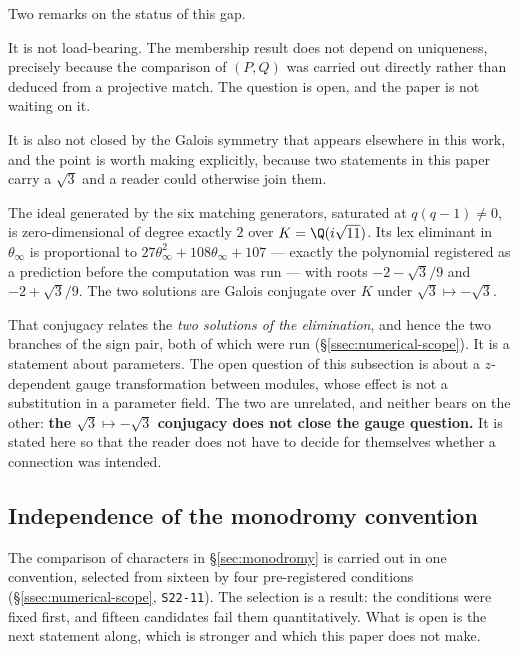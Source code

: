 Two remarks on the status of this gap.

It is not load-bearing. The membership result does not depend on uniqueness,
precisely because the comparison of $(P,Q)$ was carried out directly rather
than deduced from a projective match. The question is open, and the paper is
not waiting on it.

It is also not closed by the Galois symmetry that appears elsewhere in this
work, and the point is worth making explicitly, because two statements in this
paper carry a $\sqrt3$ and a reader could otherwise join them.

\begin{remark}
The ideal generated by the six matching generators, saturated at $q(q-1)\neq0$,
is zero-dimensional of degree exactly $2$ over $K=\Q(i\sqrt{11})$. Its lex
eliminant in $\theta_\infty$ is proportional to
$27\theta_\infty^{2}+108\theta_\infty+107$ --- exactly the polynomial
registered as a prediction before the computation was run --- with roots
$-2-\sqrt3/9$ and $-2+\sqrt3/9$. The two solutions are Galois conjugate over
$K$ under $\sqrt3\mapsto-\sqrt3$.
\end{remark}

That conjugacy relates the \emph{two solutions of the elimination}, and hence
the two branches of the sign pair, both of which were run
(\S\ref{ssec:numerical-scope}). It is a statement about parameters. The open
question of this subsection is about a $z$-dependent gauge transformation
between modules, whose effect is not a substitution in a parameter field. The
two are unrelated, and neither bears on the other: \textbf{the
$\sqrt3\mapsto-\sqrt3$ conjugacy does not close the gauge question.} It is
stated here so that the reader does not have to decide for themselves whether a
connection was intended.

\subsection{Independence of the monodromy convention}\label{ssec:convention-independence}

The comparison of characters in \S\ref{sec:monodromy} is carried out in one
convention, selected from sixteen by four pre-registered conditions
(\S\ref{ssec:numerical-scope}, \texttt{S22-11}). The selection is a result: the
conditions were fixed first, and fifteen candidates fail them quantitatively.
What is open is the next statement along, which is stronger and which this
paper does not make.

